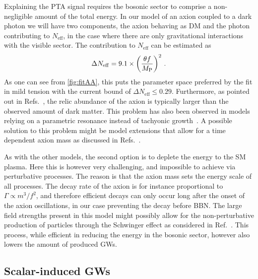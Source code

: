 \documentclass{article}
\newcommand*{\Neff}{\ensuremath{N_\mathrm{eff}}\xspace}
\begin{document}
Explaining the PTA signal requires the bosonic sector to comprise a non-negligible amount of the total energy. In our model of an axion coupled to a dark photon we will have two components, the axion behaving as DM and the photon contributing to \Neff, in the case where there are only gravitational interactions with the visible sector. The contribution to \Neff can be estimated as \cite{Ratzinger:2020oct}
\begin{align}
    \Delta \Neff=9.1\times\left(\frac{\theta f}{M_{\rm P}}\right)^{2}\,.
\end{align}
As one can see from \cref{fig:fitAA}, this puts the parameter space preferred by the fit in mild tension with the current bound of $\Delta \Neff\leq0.29$. Furthermore, as pointed out in Refs.~\cite{Kitajima:2017peg,Ratzinger:2020oct,Namba:2020kij}, the relic abundance of the axion is typically larger than the observed amount of dark matter. This problem has also been observed in models relying on a parametric resonance instead of tachyonic growth~\cite{Chatrchyan:2020pzh,Eroncel:2022vjg,Madge:2021abk}. A possible solution to this problem might be model extensions that allow for a time dependent axion mass as discussed in Refs.~\cite{Ratzinger:2020oct,Namba:2020kij}.

As with the other models, the second option is to deplete the energy to the SM plasma. Here this is however very challenging, and impossible to achieve via perturbative processes. 
The reason is that the axion mass sets the energy scale of all processes. The decay rate of the axion is for instance proportional to $\Gamma\propto m^3/f^2$, and therefore efficient decays can only occur long after the onset of the axion oscillations, in our case preventing the decay before BBN. The large field strengths present in this model might possibly allow for the non-perturbative production of particles through the Schwinger effect as considered in Ref.~\cite{Domcke:2019qmm}. This process, while efficient in reducing the energy in the bosonic sector, however also lowers the amount of produced GWs.

%
\subsection{Scalar-induced GWs}\label{sec:scalar_induced_results}
%
\end{document}
